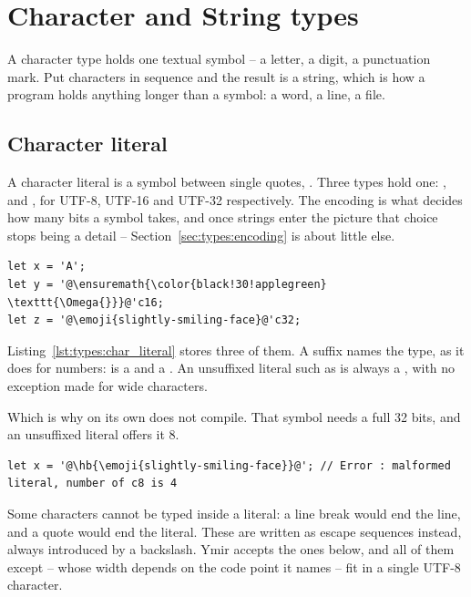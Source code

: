 \vfill\pagebreak
\section{Character and String types}
\label{sec:types:chars_strings}

A character type holds one textual symbol -- a letter, a digit, a punctuation
mark. Put characters in sequence and the result is a string, which is how a
program holds anything longer than a symbol: a word, a line, a file.

\subsection{Character literal}
\label{sec:types:char_literal}

A character literal is a symbol between single quotes, . Three types
hold one: ,  and , for UTF-8, UTF-16 and UTF-32
respectively. The encoding is what decides how many bits a symbol takes, and once
strings enter the picture that choice stops being a detail --
Section~\ref{sec:types:encoding} is about little else.

\begin{lstlisting}[style=coloredverbatim, label=lst:types:char_literal, caption=Example of character literals, escapechar=@]
let x = 'A';
let y = '@\ensuremath{\color{black!30!applegreen} \texttt{\Omega{}}}@'c16;
let z = '@\emoji{slightly-smiling-face}@'c32;
\end{lstlisting}


Listing~\ref{lst:types:char_literal} stores three of them. A suffix names the
type, as it does for numbers:  is a  and
 a . An unsuffixed literal such as  is
always a , with no exception made for wide characters.

Which is why  on its own does not compile. That symbol needs a full
32 bits, and an unsuffixed literal offers it 8.

\begin{lstlisting}[style=coloredverbatimError, label=lst:types:char_encode_error, escapechar=@]
let x = '@\hb{\emoji{slightly-smiling-face}}@'; // Error : malformed literal, number of c8 is 4 
\end{lstlisting}%

Some characters cannot be typed inside a literal: a line break would end the
line, and a quote would end the literal. These are written as escape sequences
instead, always introduced by a backslash. Ymir accepts the ones below, and all
of them except  -- whose width depends on
the code point it names -- fit in a single UTF-8 character.

